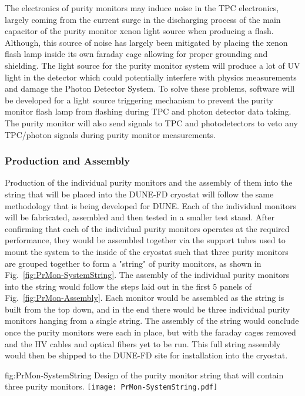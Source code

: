 The electronics of purity monitors may induce noise in the TPC electronics, largely coming from the current surge in the discharging process of the main capacitor of the purity monitor xenon light source when producing a flash.  Although, this source of noise has largely been mitigated by placing the xenon flash lamp inside its own faraday cage allowing for proper grounding and shielding.  The light source for the purity monitor system will produce a lot of UV light in the detector which could potentially interfere with physics measurements and damage the Photon Detector System. To solve these problems, software will be developed for a light source triggering mechanism to prevent the purity monitor flash lamp from flashing during TPC and photon detector data taking. The purity monitor will also send signals to TPC and photodetectors to veto any TPC/photon signals during purity monitor measurements. 


\subsubsection{Production and Assembly}
\label{sec:PrMon-Production-Assembly}
Production of the individual purity monitors and the assembly of them into the string that will be placed into the DUNE-FD cryostat will follow the same methodology that is being developed for DUNE.  Each of the individual monitors will be fabricated, assembled and then tested in a smaller test stand.  After confirming that each of the individual purity monitors operates at the required performance, they would be assembled together via the support tubes used to mount the system to the inside of the cryostat such that three purity monitors are grouped together to form a "string" of purity monitors, as shown in Fig.~\ref{fig:PrMon-SystemString}.  The assembly of the individual purity monitors into the string would follow the steps laid out in the first 5 panels of Fig.~\ref{fig:PrMon-Assembly}.  Each monitor would be assembled as the string is built from the top down, and in the end there would be three individual purity monitors hanging from a single string.  The assembly of the string would conclude once the purity monitors were each in place, but with the faraday cages removed and the HV cables and optical fibers yet to be run.  This full string assembly would then be shipped to the DUNE-FD site for installation into the cryostat.

\begin{dunefigure}{fig:PrMon-SystemString}
  {Design of the purity monitor string that will contain three purity monitors.}
  \texttt{[image: PrMon-SystemString.pdf]}
\end{dunefigure}

